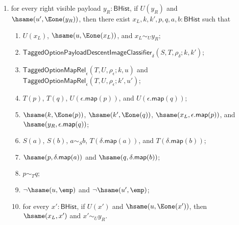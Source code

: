 \begin{theorem}
\begin{enumerate}
\begin{enumerate}
\item $\mathsf{TaggedOptionPayloadDescentImageClassifier}_{\delta}
(S,T,\rho_{\delta};k,k')$;
\item $\mathsf{TaggedOptionMapRel}_{\epsilon}(T,U,\rho_{\epsilon};k,u)$ and
$\mathsf{TaggedOptionMapRel}_{\epsilon}(T,U,\rho_{\epsilon};k',u')$;
\item $T(p)$, $T(q)$, $U(\epsilon.\mathsf{map}(p))$, and
$U(\epsilon.\mathsf{map}(q))$;
\item $\hsame(k,\Eone(p))$, $\hsame(k',\Eone(q))$,
$\hsame(x_L,\epsilon.\mathsf{map}(p))$, and
$\hsame(y_R,\epsilon.\mathsf{map}(q))$;
\item $S(a)$, $S(b)$, $a\sim_S b$, $T(\delta.\mathsf{map}(a))$, and
$T(\delta.\mathsf{map}(b))$;
\item $\hsame(p,\delta.\mathsf{map}(a))$ and
$\hsame(q,\delta.\mathsf{map}(b))$;
\item $p\sim_T q$;
\item $\neg\hsame(u,\emp)$ and $\neg\hsame(u',\emp)$;
\item for every $y':\mathsf{BHist}$, if $U(y')$ and
$\hsame(u',\Eone(y'))$, then $\hsame(y_R,y')$ and $x_L\sim_U y'$.
\end{enumerate}
\item for every right visible payload $y_R:\mathsf{BHist}$, if $U(y_R)$ and
$\hsame(u',\Eone(y_R))$, then there exist $x_L,k,k',p,q,a,b:\mathsf{BHist}$ such
that
\begin{enumerate}
\item $U(x_L)$, $\hsame(u,\Eone(x_L))$, and $x_L\sim_U y_R$;
\item $\mathsf{TaggedOptionPayloadDescentImageClassifier}_{\delta}
(S,T,\rho_{\delta};k,k')$;
\item $\mathsf{TaggedOptionMapRel}_{\epsilon}(T,U,\rho_{\epsilon};k,u)$ and
$\mathsf{TaggedOptionMapRel}_{\epsilon}(T,U,\rho_{\epsilon};k',u')$;
\item $T(p)$, $T(q)$, $U(\epsilon.\mathsf{map}(p))$, and
$U(\epsilon.\mathsf{map}(q))$;
\item $\hsame(k,\Eone(p))$, $\hsame(k',\Eone(q))$,
$\hsame(x_L,\epsilon.\mathsf{map}(p))$, and
$\hsame(y_R,\epsilon.\mathsf{map}(q))$;
\item $S(a)$, $S(b)$, $a\sim_S b$, $T(\delta.\mathsf{map}(a))$, and
$T(\delta.\mathsf{map}(b))$;
\item $\hsame(p,\delta.\mathsf{map}(a))$ and
$\hsame(q,\delta.\mathsf{map}(b))$;
\item $p\sim_T q$;
\item $\neg\hsame(u,\emp)$ and $\neg\hsame(u',\emp)$;
\item for every $x':\mathsf{BHist}$, if $U(x')$ and
$\hsame(u,\Eone(x'))$, then $\hsame(x_L,x')$ and $x'\sim_U y_R$.
\end{enumerate}
\end{enumerate}
\end{theorem}
